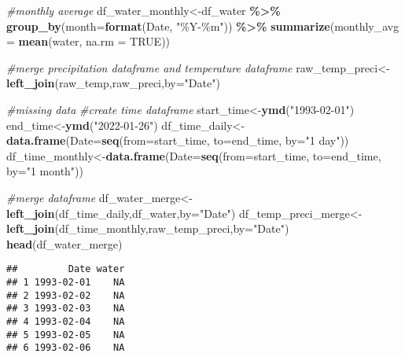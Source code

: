 \documentclass[
]{article}
\newenvironment{Shaded}{\begin{snugshade}}{\end{snugshade}}
\newcommand{\AttributeTok}[1]{\textcolor[rgb]{0.13,0.29,0.53}{#1}}
\newcommand{\CommentTok}[1]{\textcolor[rgb]{0.56,0.35,0.01}{\textit{#1}}}
\newcommand{\ConstantTok}[1]{\textcolor[rgb]{0.56,0.35,0.01}{#1}}
\newcommand{\FunctionTok}[1]{\textcolor[rgb]{0.13,0.29,0.53}{\textbf{#1}}}
\newcommand{\NormalTok}[1]{#1}
\newcommand{\OtherTok}[1]{\textcolor[rgb]{0.56,0.35,0.01}{#1}}
\newcommand{\SpecialCharTok}[1]{\textcolor[rgb]{0.81,0.36,0.00}{\textbf{#1}}}
\newcommand{\StringTok}[1]{\textcolor[rgb]{0.31,0.60,0.02}{#1}}
\begin{document}
\begin{Shaded}
\begin{Highlighting}[]
\CommentTok{\#monthly average }
\NormalTok{df\_water\_monthly}\OtherTok{\textless{}{-}}\NormalTok{df\_water }\SpecialCharTok{\%\textgreater{}\%}
  \FunctionTok{group\_by}\NormalTok{(}\AttributeTok{month=}\FunctionTok{format}\NormalTok{(Date, }\StringTok{"\%Y{-}\%m"}\NormalTok{)) }\SpecialCharTok{\%\textgreater{}\%}
  \FunctionTok{summarize}\NormalTok{(}\AttributeTok{monthly\_avg =} \FunctionTok{mean}\NormalTok{(water, }\AttributeTok{na.rm =} \ConstantTok{TRUE}\NormalTok{))}


\CommentTok{\#merge precipitation dataframe and temperature dataframe }
\NormalTok{raw\_temp\_preci}\OtherTok{\textless{}{-}}\FunctionTok{left\_join}\NormalTok{(raw\_temp,raw\_preci,}\AttributeTok{by=}\StringTok{"Date"}\NormalTok{)}

\CommentTok{\#missing data}
\CommentTok{\#create time dataframe}
\NormalTok{start\_time}\OtherTok{\textless{}{-}}\FunctionTok{ymd}\NormalTok{(}\StringTok{"1993{-}02{-}01"}\NormalTok{)}
\NormalTok{end\_time}\OtherTok{\textless{}{-}}\FunctionTok{ymd}\NormalTok{(}\StringTok{"2022{-}01{-}26"}\NormalTok{)}
\NormalTok{df\_time\_daily}\OtherTok{\textless{}{-}}\FunctionTok{data.frame}\NormalTok{(}\AttributeTok{Date=}\FunctionTok{seq}\NormalTok{(}\AttributeTok{from=}\NormalTok{start\_time, }\AttributeTok{to=}\NormalTok{end\_time, }\AttributeTok{by=}\StringTok{"1 day"}\NormalTok{))}
\NormalTok{df\_time\_monthly}\OtherTok{\textless{}{-}}\FunctionTok{data.frame}\NormalTok{(}\AttributeTok{Date=}\FunctionTok{seq}\NormalTok{(}\AttributeTok{from=}\NormalTok{start\_time, }\AttributeTok{to=}\NormalTok{end\_time, }\AttributeTok{by=}\StringTok{"1 month"}\NormalTok{))}

\CommentTok{\#merge dataframe}
\NormalTok{df\_water\_merge}\OtherTok{\textless{}{-}}\FunctionTok{left\_join}\NormalTok{(df\_time\_daily,df\_water,}\AttributeTok{by=}\StringTok{"Date"}\NormalTok{)}
\NormalTok{df\_temp\_preci\_merge}\OtherTok{\textless{}{-}}\FunctionTok{left\_join}\NormalTok{(df\_time\_monthly,raw\_temp\_preci,}\AttributeTok{by=}\StringTok{"Date"}\NormalTok{)}
\FunctionTok{head}\NormalTok{(df\_water\_merge)}
\end{Highlighting}
\end{Shaded}

\begin{verbatim}
##         Date water
## 1 1993-02-01    NA
## 2 1993-02-02    NA
## 3 1993-02-03    NA
## 4 1993-02-04    NA
## 5 1993-02-05    NA
## 6 1993-02-06    NA
\end{verbatim}
\end{document}
